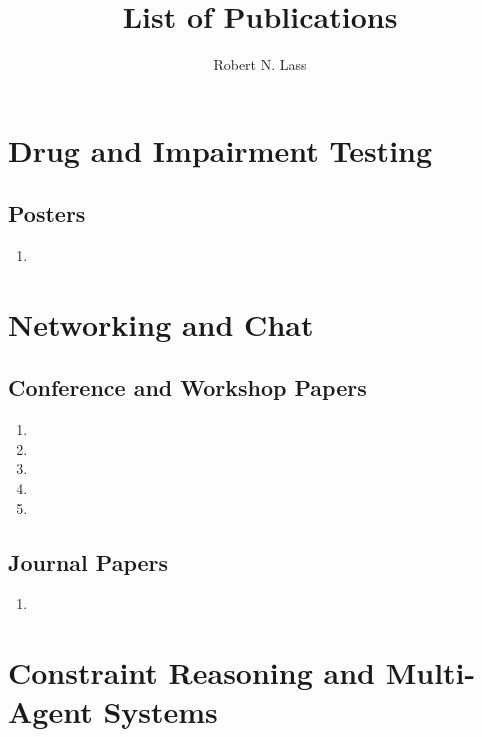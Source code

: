 \documentclass{article}
\begin{document}
	
    \title{List of Publications}
    \author{Robert N. Lass}
    \date{}
    \maketitle

    \section*{Drug and Impairment Testing}
        \subsection*{Posters}
            \begin{enumerate}[series=pubs]
                \item {}
			\end{enumerate}


	\section*{Networking and Chat}
		\subsection*{Conference and Workshop Papers}
            \begin{enumerate}[resume=pubs]
				\item {}
				\item {}
				\item {}
				\item {}
				\item {}
			\end{enumerate}

		\subsection*{Journal Papers}
			\begin{enumerate}[resume=pubs]
				\item {}
			\end{enumerate}

	\section*{Constraint Reasoning and Multi-Agent Systems}
\end{document}

